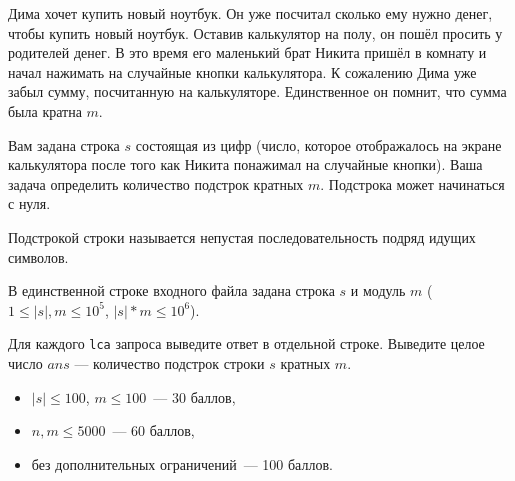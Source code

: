
\Legend

Дима хочет купить новый ноутбук. Он уже посчитал сколько ему нужно денег, чтобы купить новый ноутбук. Оставив калькулятор на полу, он пошёл просить у родителей денег. В это время его маленький брат Никита пришёл в комнату и начал нажимать на случайные кнопки калькулятора. К сожалению Дима уже забыл сумму, посчитанную на калькуляторе. Единственное он помнит, что сумма была кратна $m$.

Вам задана строка $s$ состоящая из цифр (число, которое отображалось на экране калькулятора после того как Никита понажимал на случайные кнопки). Ваша задача определить количество подстрок кратных $m$. Подстрока может начинаться с нуля.

Подстрокой строки называется непустая последовательность подряд идущих символов.

\Input
В единственной строке входного файла задана строка $s$ и модуль $m$ ($1 \le |s|, m \le 10^5$, $|s| * m \le 10^6$).

\Output
Для каждого \texttt{lca} запроса выведите ответ в отдельной строке.
Выведите целое число $ans$ — количество подстрок строки $s$ кратных $m$.

\Samples
\BeginTests
\EndTests

\Scoring
\begin{itemize}
	\item $|s| \le 100$, $m \le 100$~--- 30 баллов,
	\item $n, m \le 5000$~--- 60 баллов,
	\item без дополнительных ограничений~--- 100 баллов.
\end{itemize}

\EndProblem
